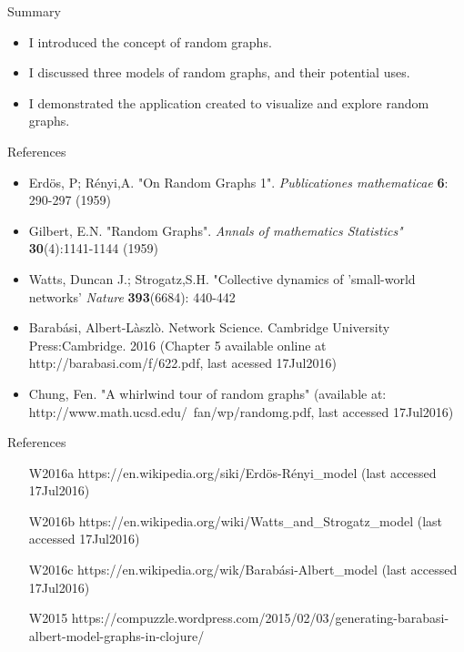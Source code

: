 \documentclass{beamer}
\begin{document}
\begin{frame}{Summary}

  \begin{itemize}
  \item I introduced the concept of random graphs.
  \item I discussed three models of random graphs, and their potential uses.
  \item I demonstrated the application created to visualize and explore random graphs.
  \end{itemize}

\end{frame}

\begin{frame}{References}
\begin{itemize}   
  \item Erd\"os, P; R\'enyi,A. "On Random Graphs 1". {\em Publicationes mathematicae} \textbf{6}: 290-297 (1959)
  \item Gilbert, E.N. "Random Graphs". {\em Annals of mathematics Statistics"} \textbf{30}(4):1141-1144 (1959)
  \item Watts, Duncan J.; Strogatz,S.H. "Collective dynamics of 'small-world networks' {\em Nature} \textbf{393}(6684): 440-442
  \item Barab\'asi, Albert-L\`aszl\`o. Network Science. Cambridge University Press:Cambridge. 2016 (Chapter 5 available online at http://barabasi.com/f/622.pdf, last acessed 17Jul2016) 
  \item Chung, Fen. "A whirlwind tour of random graphs" (available at: http://www.math.ucsd.edu/~fan/wp/randomg.pdf, last accessed 17Jul2016)

  \end{itemize}
\end{frame}

\begin{frame}{References}
\begin{itemize}
  \item [W2016a]https://en.wikipedia.org/siki/Erd\"os-R\'enyi\_model (last accessed 17Jul2016)
  \item [W2016b]https://en.wikipedia.org/wiki/Watts\_and\_Strogatz\_model (last accessed 17Jul2016)
  \item [W2016c]https://en.wikipedia.org/wik/Barab\'asi-Albert\_model (last accessed 17Jul2016)
  \item [W2015]https://compuzzle.wordpress.com/2015/02/03/generating-barabasi-albert-model-graphs-in-clojure/  
  \end{itemize}
\end{frame}
\end{document}
